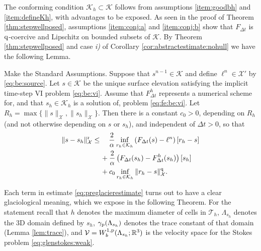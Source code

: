 \documentclass[hidelinks,onefignum,onetabnum,final]{siamart220329}  %
\newcommand{\RR}{\mathbb{R}}
\newcommand{\cK}{\mathcal{K}}
\newcommand{\cT}{\mathcal{T}}
\newcommand{\cV}{\mathcal{V}}
\newcommand{\cX}{\mathcal{X}}
\newcommand{\pp}{{\text{\textnormal{p}}}}
\newcommand{\qq}{{\text{\textnormal{q}}}}
\newcommand{\rr}{{\text{\textnormal{r}}}}
\begin{document}
\medskip
The conforming condition $\cK_h\subset \cK$ follows from assumptions \ref{item:goodbh} and \ref{item:defineKh}, with advantages to be exposed.  As seen in the proof of Theorem \ref{thm:stepwellposed}, assumptions \ref{item:conj:a} and \ref{item:conj:b} show that $F_{\Delta t}$ is $\qq$-coercive and Lipschitz on bounded subsets of $\cK$.  By Theorem \ref{thm:stepwellposed} and case \emph{i)} of Corollary \ref{cor:abstractestimate:nohull} we have the following Lemma.

\begin{lemma} \label{lem:preglacierapp}  Make the Standard Assumptions.  Suppose that $s^{n-1}\in\cK$ and define $\ell^n \in \cX'$ by \eqref{eq:be:source}.  Let $s\in\cK$ be the unique surface elevation satisfying the implicit time-step VI problem \eqref{eq:be:vi}.  Assume that $F^h_{\Delta t}$ represents a numerical scheme for, and that $s_h\in\cK_h$ is a solution of, problem \eqref{eq:fe:be:vi}.  Let $R_h=\max\{\|s\|_\cX,\|s_h\|_\cX\}$.  Then there is a constant $c_0>0$, depending on $R_h$ (and not otherwise depending on $s$ or $s_h$), and independent of $\Delta t>0$, so that
\begin{align}
\|s-s_h\|_\cX^\rr &\le \quad \frac{2}{\alpha} \inf_{r_h\in\cK_h} \left(F_{\Delta t}(s)-\ell^n\right)[r_h-s] \label{eq:preglacierestimate} \\
   &\quad\, + \frac{2}{\alpha} \left(F_{\Delta t}(s_h)-F^h_{\Delta t}(s_h)\right)[s_h] \notag \\
   &\quad\, + c_0 \inf_{r_h\in\cK_h} \|r_h - s\|_{\cX}^\qq. \notag
\end{align}
\end{lemma}

Each term in estimate \eqref{eq:preglacierestimate} turns out to have a clear glaciological meaning, which we expose in the following Theorem.  For the statement recall that $h$ denotes the maximum diameter of cells in $\cT_h$, $\Lambda_{s_h}$ denotes the 3D domain defined by $s_h$, $\gamma_\pp(\Lambda_{s_h})$ denotes the trace constant of that domain (Lemma \ref{lem:trace}), and $\cV=W_b^{1,\pp}(\Lambda_{s_h}; \RR^3)$ is the velocity space for the Stokes problem \eqref{eq:glenstokes:weak}.
\end{document}
